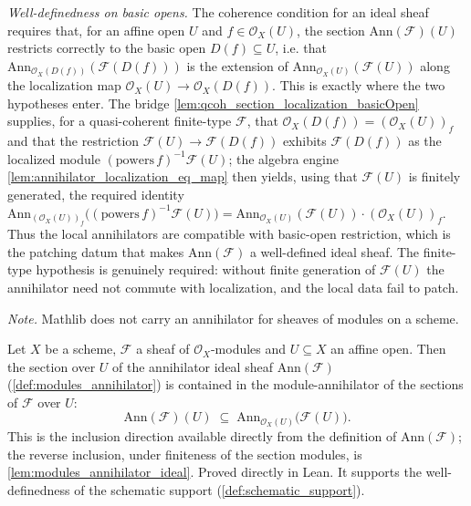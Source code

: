 \begin{definition}
  \emph{Well-definedness on basic opens.} The coherence condition for an ideal
  sheaf requires that, for an affine open \(U\) and \(f \in \mathcal{O}_X(U)\),
  the section \(\mathrm{Ann}(\mathcal{F})(U)\) restricts correctly to the basic
  open \(D(f) \subseteq U\), i.e. that
  \(\mathrm{Ann}_{\mathcal{O}_X(D(f))}(\mathcal{F}(D(f)))\) is the extension of
  \(\mathrm{Ann}_{\mathcal{O}_X(U)}(\mathcal{F}(U))\) along the localization map
  \(\mathcal{O}_X(U) \to \mathcal{O}_X(D(f))\). This is exactly where the two
  hypotheses enter. The bridge
  \cref{lem:qcoh_section_localization_basicOpen} supplies, for a quasi-coherent
  finite-type \(\mathcal{F}\), that \(\mathcal{O}_X(D(f)) = (\mathcal{O}_X(U))_f\)
  and that the restriction \(\mathcal{F}(U) \to \mathcal{F}(D(f))\) exhibits
  \(\mathcal{F}(D(f))\) as the localized module \((\mathrm{powers}\,f)^{-1}
  \mathcal{F}(U)\); the algebra engine
  \cref{lem:annihilator_localization_eq_map} then yields, using that
  \(\mathcal{F}(U)\) is finitely generated, the required identity
  \(\mathrm{Ann}_{(\mathcal{O}_X(U))_f}\bigl((\mathrm{powers}\,f)^{-1}
  \mathcal{F}(U)\bigr) = \mathrm{Ann}_{\mathcal{O}_X(U)}(\mathcal{F}(U)) \cdot
  (\mathcal{O}_X(U))_f\). Thus the local annihilators are compatible with basic-open
  restriction, which is the patching datum that makes \(\mathrm{Ann}(\mathcal{F})\)
  a well-defined ideal sheaf. The finite-type hypothesis is genuinely required:
  without finite generation of \(\mathcal{F}(U)\) the annihilator need not commute
  with localization, and the local data fail to patch.

  \emph{Note.} Mathlib does not carry an annihilator for sheaves of modules on a scheme.
\end{definition}

\begin{lemma}
  \label{lem:modules_annihilator_ideal_le}
  Let \(X\) be a scheme, \(\mathcal{F}\) a sheaf of \(\mathcal{O}_X\)-modules and
  \(U \subseteq X\) an affine open. Then the section over \(U\) of the annihilator
  ideal sheaf \(\mathrm{Ann}(\mathcal{F})\) (\cref{def:modules_annihilator}) is
  contained in the module-annihilator of the sections of \(\mathcal{F}\) over
  \(U\):
  \[
    \mathrm{Ann}(\mathcal{F})(U)
    \;\subseteq\; \mathrm{Ann}_{\mathcal{O}_X(U)}\bigl(\mathcal{F}(U)\bigr).
  \]
  This is the inclusion direction available directly from the definition of
  \(\mathrm{Ann}(\mathcal{F})\); the reverse inclusion, under finiteness of the
  section modules, is \cref{lem:modules_annihilator_ideal}. Proved directly
  in Lean. It supports the well-definedness of the schematic support
  (\cref{def:schematic_support}).
\end{lemma}

